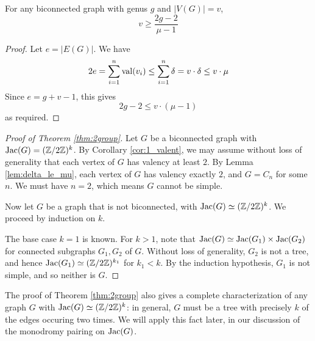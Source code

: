 \documentclass{amsart}
\begin{document}
\begin{cor}
  \label{cor:genus_v_mu}
  For any biconnected graph with genus $g$ and $|V(G)| = v$,
  \begin{equation*}
    v \ge \frac{2g - 2}{\mu - 1}
  \end{equation*}
\end{cor}
\begin{proof}
  Let $e = |E(G)|$. We have 
  \begin{equation*}
    2e = \sum_{i=1}^n \operatorname{val}(v_i) \le \sum_{i=1}^n \delta = v \cdot \delta
    \le v \cdot \mu
  \end{equation*}
  Since $e = g + v - 1$, this gives
  \begin{equation*}
    2g - 2 \le v \cdot (\mu - 1)
  \end{equation*}
  as required.

\end{proof}

\begin{proof}[Proof of Theorem \ref{thm:2group}]
  Let $G$ be a biconnected graph with $\operatorname{Jac}(G) = (\mathbb{Z}/2\mathbb{Z})^k$. By
  Corollary \ref{cor:1_valent}, we may assume without loss of
  generality that each vertex of $G$ has valency at least $2$. By
  Lemma \ref{lem:delta_le_mu}, each vertex of $G$ has valency exactly
  $2$, and $G = C_n$ for some $n$. We must have $n=2$, which means $G$
  cannot be simple.

  Now let $G$ be a graph that is not biconnected, with $\operatorname{Jac}(G) \simeq
  (\mathbb{Z}/2\mathbb{Z})^k$. We proceed by induction on $k$.
  
  The base case $k=1$ is known. For $k > 1$, note that $\operatorname{Jac}(G) \simeq
  \operatorname{Jac}(G_1) \times \operatorname{Jac}(G_2)$ for connected subgraphs $G_1, G_2$ of
  $G$. Without loss of generality, $G_2$ is not a tree, and
  hence $\operatorname{Jac}(G_1) \simeq (\mathbb{Z}/2\mathbb{Z})^{k_1}$ for $k_1 < k$. By the
  induction hypothesis, $G_1$ is not simple, and so neither is $G$.
\end{proof}

\begin{remark}
  The proof of Theorem \ref{thm:2group} also gives a complete
  characterization of any graph $G$ with $\operatorname{Jac}(G) \simeq
  (\mathbb{Z}/2\mathbb{Z})^k$: in general, $G$ must be a tree with precisely $k$ of
  the edges occuring two times. We will apply this fact later, in our
  discussion of the monodromy pairing on $\operatorname{Jac}(G)$.
\end{remark}
\end{document}
